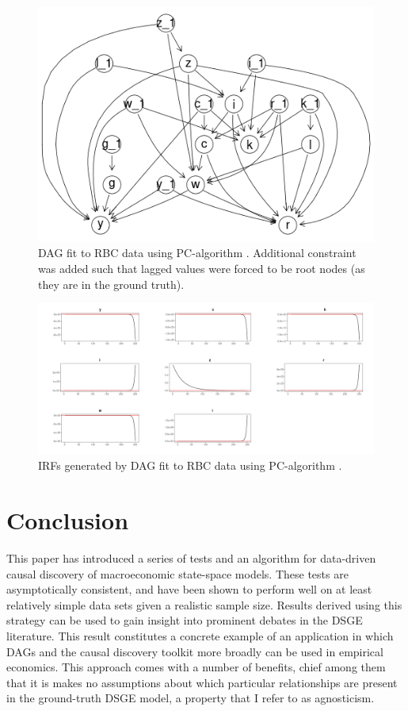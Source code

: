 \documentclass{article}
\begin{document}
\begin{figure}
  \centering
  \includegraphics[width=0.8\linewidth]{images/rbc_constraint_dag.png}
  \caption{DAG fit to RBC data using PC-algorithm \parencite{kalisch2007estimating}. Additional constraint was added such that lagged values were forced to be root nodes (as they are in the ground truth).}
  \label{pcdag}
\end{figure}

\begin{figure}
  \centering
  \includegraphics[width=0.8\linewidth]{images/rbc_constraint_irf.png}
  \caption{IRFs generated by DAG fit to RBC data using PC-algorithm \parencite{kalisch2007estimating}.}
  \label{pcirf}
\end{figure}

\section{Conclusion} \label{conclusion}

This paper has introduced a series of tests and an algorithm for data-driven causal discovery of macroeconomic state-space models. These tests are asymptotically consistent, and have been shown to perform well on at least relatively simple data sets given a realistic sample size. Results derived using this strategy can be used to gain insight into prominent debates in the DSGE literature. This result constitutes a concrete example of an application in which DAGs and the causal discovery toolkit more broadly can be used in empirical economics. This approach comes with a number of benefits, chief among them that it is makes no assumptions about which particular relationships are present in the ground-truth DSGE model, a property that I refer to as agnosticism.
\end{document}
